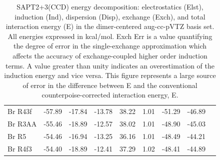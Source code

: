 \begin{sie}
\begin{table}
\begin{center}
\begin{tabular}{lrrrrccrr}
Br\sur{-} R43f             & -57.89 &-17.84 &-13.78 &38.22 &1.01 & -51.29 &-46.89 \tabularnewline
Br\sur{-} R3AA\sur{\prime} & -55.46 &-18.89 &-12.57 &38.02 &1.01 & -48.90 &-45.03 \tabularnewline
Br\sur{-} R5               & -54.46 &-16.94 &-13.25 &36.16 &1.01 & -48.49 &-44.21 \tabularnewline
Br\sur{-} R4f3             & -54.40 &-18.89 &-12.41 &37.29 &1.02 & -48.41 &-44.89 \tabularnewline
  \hline
 \end{tabular}
 \end{center}
 \caption[Interaction energies for ion/water clusters with \emph{n} = 5]{\label{tab:sapt3} SAPT2+3(CCD) energy decomposition: electrostatics
 (Elst), induction (Ind), dispersion (Disp), exchange (Exch), 
 and total interaction energy (E) in the dimer-centered aug-cc-pVTZ basis set. All energies expressed in kcal/mol. Exch Err is a 
 value quantifying the degree of error in the single-exchange approximation which affects the accuracy of exchange-coupled higher order 
 induction terms. A value greater than unity indicates an overestimation of the induction energy and vice versa. This figure represents
 a large source of error in the difference between E and the conventional counterpoise-corrected interaction energy, E.}
\end{table}


\end{sie}
